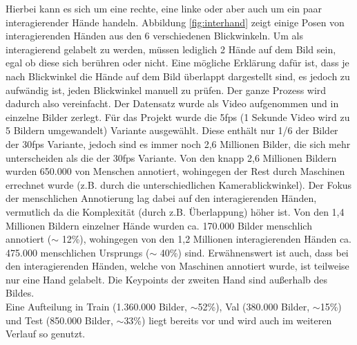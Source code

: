 Hierbei kann es sich um eine rechte, eine linke oder aber auch um ein paar interagierender Hände handeln.
Abbildung \ref{fig:interhand} zeigt einige Posen von interagierenden Händen aus den 6 verschiedenen Blickwinkeln.
Um als interagierend gelabelt zu werden, müssen lediglich 2 Hände auf dem Bild sein, egal ob diese sich berühren oder nicht. 
Eine mögliche Erklärung dafür ist, dass je nach Blickwinkel die Hände auf dem Bild überlappt dargestellt sind, es jedoch zu aufwändig ist, jeden Blickwinkel manuell zu prüfen. 
Der ganze Prozess wird dadurch also vereinfacht. \newline
Der Datensatz wurde als Video aufgenommen und in einzelne Bilder zerlegt.
Für das Projekt wurde die 5fps (1 Sekunde Video wird zu 5 Bildern umgewandelt) Variante ausgewählt.
Diese enthält nur 1/6 der Bilder der 30fps Variante, jedoch sind es immer noch 2,6 Millionen Bilder, die sich mehr unterscheiden als die der 30fps Variante. \newline
Von den knapp 2,6 Millionen Bildern wurden  650.000 von Menschen annotiert, wohingegen der Rest durch Maschinen errechnet wurde (z.B. durch die unterschiedlichen Kamerablickwinkel). 
Der Fokus der menschlichen Annotierung lag dabei auf den interagierenden Händen, vermutlich da die Komplexität (durch z.B. Überlappung) höher ist.
Von den 1,4 Millionen Bildern einzelner Hände wurden ca. 170.000 Bilder menschlich annotiert ($\sim$ 12\%), wohingegen von den 1,2 Millionen interagierenden Händen ca. 475.000 menschlichen Ursprungs ($\sim$ 40\%) sind. 
Erwähnenswert ist auch, dass bei den interagierenden Händen, welche von Maschinen annotiert wurde, ist teilweise nur eine Hand gelabelt.
Die Keypoints der zweiten Hand sind außerhalb des Bildes. \\
Eine Aufteilung in Train (1.360.000 Bilder, $\sim$52\%), Val (380.000 Bilder, $\sim$15\%) und Test (850.000 Bilder, $\sim$33\%) liegt bereits vor und wird auch im weiteren Verlauf so genutzt.

